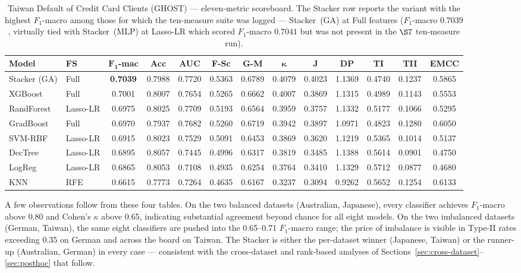 \begin{table}[H]
\centering
\caption{Taiwan Default of Credit Card Clients (GHOST) ---
eleven-metric scoreboard. The Stacker row reports the variant with
the highest $F_1$-macro among those for which the ten-measure
suite was logged --- Stacker~(GA) at Full features
($F_1$-macro $0.7039$, virtually tied with Stacker~(MLP) at
Lasso-LR which scored $F_1$-macro $0.7041$ but was not present in
the $\S 7$ ten-measure run).}
\singlespacing
\label{tab:11m-tai}
\scriptsize
\setlength{\tabcolsep}{3.5pt}
\renewcommand{\arraystretch}{1.15}
\begin{tabular}{l l c c c c c c c c c c c}
\toprule
\textbf{Model} & \textbf{FS} & $\boldsymbol{F_1}$\textbf{-mac} & \textbf{Acc} & \textbf{AUC} & \textbf{F-Sc} & \textbf{G-M} & $\boldsymbol{\kappa}$ & \textbf{J} & \textbf{DP} & \textbf{TI} & \textbf{TII} & \textbf{EMCC}\\
\midrule
Stacker (GA) & Full     & \textbf{0.7039} & 0.7988 & 0.7720 & 0.5363 & 0.6789 & 0.4079 & 0.4023 & 1.1369 & 0.4740 & 0.1237 & 0.5865\\
XGBoost      & Full     & 0.7001 & 0.8007 & 0.7654 & 0.5265 & 0.6662 & 0.4007 & 0.3869 & 1.1315 & 0.4989 & 0.1143 & 0.5553\\
RandForest   & Lasso-LR & 0.6975 & 0.8025 & 0.7709 & 0.5193 & 0.6564 & 0.3959 & 0.3757 & 1.1332 & 0.5177 & 0.1066 & 0.5295\\
GradBoost    & Full     & 0.6970 & 0.7937 & 0.7682 & 0.5260 & 0.6719 & 0.3942 & 0.3897 & 1.0971 & 0.4823 & 0.1280 & 0.6050\\
SVM-RBF      & Lasso-LR & 0.6915 & 0.8023 & 0.7529 & 0.5091 & 0.6453 & 0.3869 & 0.3620 & 1.1219 & 0.5365 & 0.1014 & 0.5137\\
DecTree      & Lasso-LR & 0.6895 & 0.8057 & 0.7445 & 0.4996 & 0.6317 & 0.3819 & 0.3485 & 1.1388 & 0.5614 & 0.0901 & 0.4750\\
LogReg       & Lasso-LR & 0.6865 & 0.8053 & 0.7108 & 0.4935 & 0.6254 & 0.3764 & 0.3410 & 1.1329 & 0.5712 & 0.0877 & 0.4680\\
KNN          & RFE      & 0.6615 & 0.7773 & 0.7264 & 0.4635 & 0.6167 & 0.3237 & 0.3094 & 0.9262 & 0.5652 & 0.1254 & 0.6133\\
\bottomrule
\end{tabular}
\end{table}

A few observations follow from these four tables.  On the two
balanced datasets (Australian, Japanese), every classifier achieves
$F_1$-macro above 0.80 and Cohen's $\kappa$ above 0.65, indicating
substantial agreement beyond chance for all eight models.  On the two
imbalanced datasets (German, Taiwan), the same eight classifiers are
pushed into the 0.65--0.71 $F_1$-macro range; the price of imbalance
is visible in Type-II rates exceeding 0.35 on German and across the
board on Taiwan.  The Stacker is either the per-dataset winner
(Japanese, Taiwan) or the runner-up (Australian, German) in every
case --- consistent with the cross-dataset and rank-based analyses of
Sections~\ref{sec:cross-dataset}--\ref{sec:posthoc} that follow.

